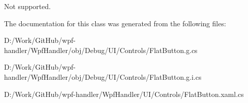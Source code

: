Not supported. 



The documentation for this class was generated from the following files\+:\begin{DoxyCompactItemize}
\item 
D\+:/\+Work/\+Git\+Hub/wpf-\/handler/\+Wpf\+Handler/obj/\+Debug/\+U\+I/\+Controls/Flat\+Button.\+g.\+cs\item 
D\+:/\+Work/\+Git\+Hub/wpf-\/handler/\+Wpf\+Handler/obj/\+Debug/\+U\+I/\+Controls/Flat\+Button.\+g.\+i.\+cs\item 
D\+:/\+Work/\+Git\+Hub/wpf-\/handler/\+Wpf\+Handler/\+U\+I/\+Controls/Flat\+Button.\+xaml.\+cs\end{DoxyCompactItemize}
